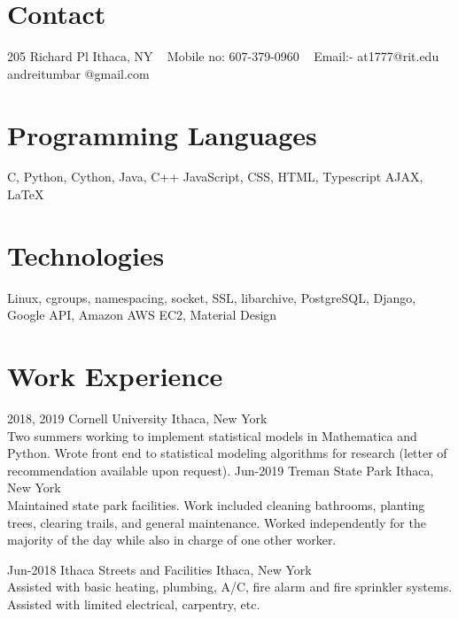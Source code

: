 \documentclass[]{alternate}          %
\begin{document}


\border{}
\bordersecond{}

\begin{aside}
%
\section{Contact}
205 Richard Pl 
Ithaca, NY
~
Mobile no:
607-379-0960
~
Email:-
at1777@rit.edu
andreitumbar
@gmail.com
%
%
\section{Programming
   Languages}
C, Python, Cython,
Java, C++ JavaScript,
CSS, HTML, Typescript
AJAX, \LaTeX{}
%
%
\section{Technologies}
Linux, cgroups,
namespacing, socket,
SSL, libarchive,
PostgreSQL, Django,
Google API, Amazon AWS EC2,
Material Design
%
\end{aside}



\section{Work Experience}

\begin{entrylist}
\entry
  {2018, 2019}
  {Cornell University}
  {Ithaca, New York}
  {\\
  Two summers working to implement statistical models in Mathematica and Python. Wrote front end to statistical modeling algorithms for research (letter of recommendation available upon request).}
\entry
  {Jun-2019}
  {Treman State Park}
  {Ithaca, New York}
  {\\
Maintained state park facilities. Work included cleaning bathrooms, planting trees, clearing trails, and general maintenance. Worked independently for the majority of the day while also in charge of one other worker.
  }

\entry
  {Jun-2018}
  {Ithaca Streets and Facilities}
  {Ithaca, New York}
  {\\
Assisted with basic heating, plumbing, A/C, fire alarm and fire sprinkler systems. Assisted with limited electrical, carpentry, etc.
  }


\end{entrylist}
\end{document}
